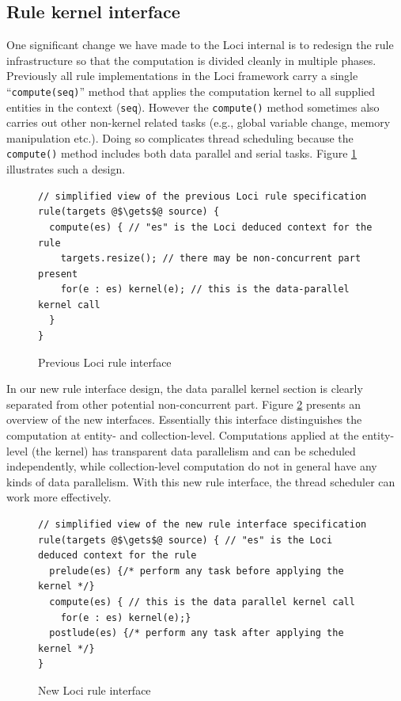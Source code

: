 \documentclass{article}
\begin{document}
\subsection{Rule kernel interface}
\label{sec:kernel}
One significant change we have made to the Loci internal is to redesign
the rule infrastructure so that the computation is divided cleanly in
multiple phases.  Previously all rule implementations in the Loci
framework carry a single ``\texttt{compute(seq)}'' method that applies
the computation kernel to all supplied entities in the context
(\lstinline{seq}).  However the \lstinline{compute()} method sometimes
also carries out other non-kernel related tasks (e.g., global variable
change, memory manipulation etc.).  Doing so complicates thread
scheduling because the \lstinline{compute()} method includes both data
parallel and serial tasks.  Figure \ref{fig:old-rule} illustrates such a
design.

\begin{figure}[h]
\begin{lstlisting}[escapechar=@]
// simplified view of the previous Loci rule specification
rule(targets @$\gets$@ source) {
  compute(es) { // "es" is the Loci deduced context for the rule
    targets.resize(); // there may be non-concurrent part present
    for(e : es) kernel(e); // this is the data-parallel kernel call
  }
}
\end{lstlisting}
\caption{Previous Loci rule interface\label{fig:old-rule}}
\end{figure}

In our new rule interface design, the data parallel kernel section is
clearly separated from other potential non-concurrent part.  Figure
\ref{fig:new-rule} presents an overview of the new interfaces.
Essentially this interface distinguishes the computation at entity- and
collection-level.  Computations applied at the entity-level (the kernel)
has transparent data parallelism and can be scheduled independently,
while collection-level computation do not in general have any kinds of
data parallelism.  With this new rule interface, the thread scheduler
can work more effectively.

\begin{figure}[h]
\begin{lstlisting}[escapechar=@]
// simplified view of the new rule interface specification
rule(targets @$\gets$@ source) { // "es" is the Loci deduced context for the rule
  prelude(es) {/* perform any task before applying the kernel */}
  compute(es) { // this is the data parallel kernel call
    for(e : es) kernel(e);}
  postlude(es) {/* perform any task after applying the kernel */}
}
\end{lstlisting}
\caption{New Loci rule interface\label{fig:new-rule}}
\end{figure}
\end{document}
